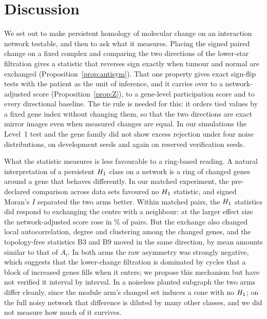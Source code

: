 \section{Discussion}\label{sec:discussion}

We set out to make persistent homology of molecular change on an interaction network testable, and then to ask what it measures. Placing the signed paired change on a fixed complex and comparing the two directions of the lower-star filtration gives a statistic that reverses sign exactly when tumour and normal are exchanged (Proposition~\ref{prop:antisym}). That one property gives exact sign-flip tests with the patient as the unit of inference, and it carries over to a network-adjusted score (Proposition~\ref{prop:Z}), to a gene-level participation score and to every directional baseline. The tie rule is needed for this: it orders tied values by a fixed gene index without changing them, so that the two directions are exact mirror images even when measured changes are equal. In our simulations the Level~1 test and the gene family did not show excess rejection under four noise distributions, on development seeds and again on reserved verification seeds.

What the statistic measures is less favourable to a ring-based reading. A natural interpretation of a persistent $H_{1}$ class on a network is a ring of changed genes around a gene that behaves differently. In our matched experiment, the pre-declared comparison across data sets favoured no $H_{1}$ statistic, and signed Moran's $I$ separated the two arms better. Within matched pairs, the $H_{1}$ statistics did respond to exchanging the centre with a neighbour: at the larger effect size the network-adjusted score rose in \pairZTwo\% of pairs. But the exchange also changed local autocorrelation, degree and clustering among the changed genes, and the topology-free statistics B3 and B9 moved in the same direction, by mean amounts similar to that of $A_i$. In both arms the raw asymmetry was strongly negative, which suggests that the lower-change filtration is dominated by cycles that a block of increased genes fills when it enters; we propose this mechanism but have not verified it interval by interval. In a noiseless planted subgraph the two arms differ cleanly, since the module arm's changed set induces a cone with no $H_{1}$; on the full noisy network that difference is diluted by many other classes, and we did not measure how much of it survives.

